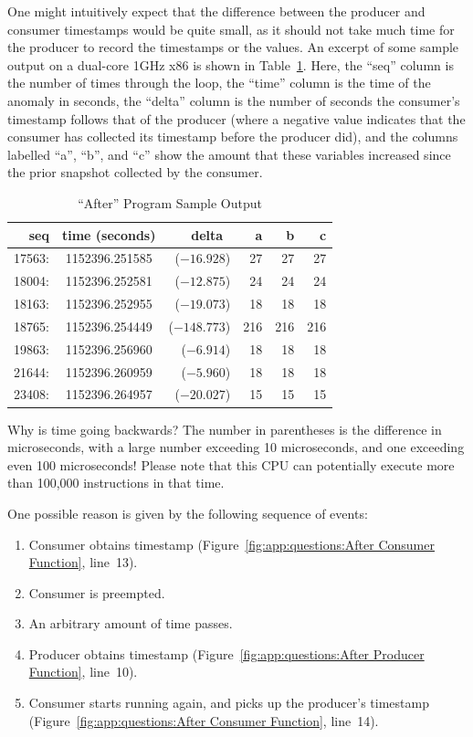 One might intuitively expect that the difference between the producer
and consumer timestamps would be quite small, as it should not take
much time for the producer to record the timestamps or the values.
An excerpt of some sample output on a dual-core 1GHz x86 is shown in
Table~\ref{tab:app:questions:After Program Sample Output}.
Here, the ``seq'' column is the number of times through the loop,
the ``time'' column is the time of the anomaly in seconds, the ``delta''
column is the number of seconds the consumer's timestamp follows that
of the producer (where a negative value indicates that the consumer
has collected its timestamp before the producer did), and the
columns labelled ``a'', ``b'', and ``c'' show the amount that these
variables increased since the prior snapshot collected by the consumer.

\begin{table}[htbp]
\centering
\scriptsize
\begin{tabular}{rcrrrr}
seq    & time (seconds) & delta~    &  a &  b &  c \\
\hline
17563: & 1152396.251585 & ($-16.928$) & 27 & 27 & 27 \\
18004: & 1152396.252581 & ($-12.875$) & 24 & 24 & 24 \\
18163: & 1152396.252955 & ($-19.073$) & 18 & 18 & 18 \\
18765: & 1152396.254449 & ($-148.773$) & 216 & 216 & 216 \\
19863: & 1152396.256960 & ($-6.914$) & 18 & 18 & 18 \\
21644: & 1152396.260959 & ($-5.960$) & 18 & 18 & 18 \\
23408: & 1152396.264957 & ($-20.027$) & 15 & 15 & 15 \\
\end{tabular}
\caption{``After'' Program Sample Output}
\label{tab:app:questions:After Program Sample Output}
\end{table}

Why is time going backwards?
The number in parentheses is the difference in microseconds, with
a large number exceeding 10 microseconds, and one exceeding even
100 microseconds!
Please note that this CPU can potentially execute more than 100,000
instructions in that time.

One possible reason is given by the following sequence of events:
\begin{enumerate}
\item	Consumer obtains timestamp
	(Figure~\ref{fig:app:questions:After Consumer Function}, line~13).
\item	Consumer is preempted.
\item	An arbitrary amount of time passes.
\item	Producer obtains timestamp
	(Figure~\ref{fig:app:questions:After Producer Function}, line~10).
\item	Consumer starts running again, and picks up the producer's
	timestamp
	(Figure~\ref{fig:app:questions:After Consumer Function}, line~14).
\end{enumerate}

